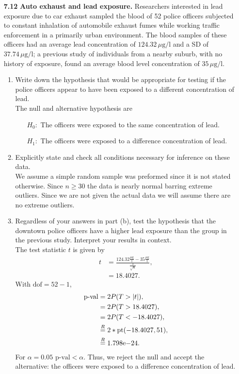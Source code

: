 \documentclass[a4paper, 12pt]{../../config/homework}
\begin{document}
\begin{enumerate}
\pagebreak
\item[\textbf{7.12}] \textbf{Auto exhaust and lead exposure.} Researchers interested in lead exposure due to car exhaust sampled the blood of 52 police officers subjected to constant inhalation of automobile exhaust fumes while working traffic enforcement in a primarily urban environment. The blood samples of these officers had an average lead concentration of \(124.32\,\mu\text{g}/\text{l}\) and a SD of \(37.74\,\mu\text{g}/\text{l}\); a previous study of individuals from a nearby suburb, with no history of exposure, found an average blood level concentration of \(35\,\mu\text{g}/\text{l}\).
\begin{enumerate}[label=(\alph*)]
\item Write down the hypothesis that would be appropriate for testing if the police officers appear to have been exposed to a different concentration of lead.
\\The null and alternative hypothesis are
\begin{enumerate}
\item[\(H_0 : \)] The officers were exposed to the same concentration of lead.
\item[\(H_1 : \)] The officers were exposed to a difference concentration of lead.
\end{enumerate}

\item Explicitly state and check all conditions necessary for inference on these data.
\\We assume a simple random sample was preformed since it is not stated otherwise. Since \(n \ge 30\) the data is nearly normal barring extreme outliers. Since we are not given the actual data we will assume there are no extreme outliers.

\item Regardless of your answers in part (b), test the hypothesis that the downtown police officers have a higher lead exposure than the group in the previous study. Interpret your results in context.
\\The test statistic \(t\) is given by
\begin{align*}
t &= \frac{124.32\frac{\mu\text{g}}{\text{l}} - 35\frac{\mu\text{g}}{\text{l}}}{\frac{s}{\sqrt{n}}},\\
&= 18.4027.
\end{align*}
With \(\text{dof}=52-1\),
\begin{align*}
\text{p-val} &= 2P(T > |t|),\\
&= 2P(T > 18.4027),\\
&= 2P(T < -18.4027),\\
&\overset{R}{=} 2*\text{pt}(-18.4027, 51),\\
&\overset{R}{=} {1.798}\mathrm{e}{-24}.
\end{align*}
For \(\alpha=0.05\) \(\text{p-val}<\alpha \). Thus, we reject the null and accept the alternative: the officers were exposed to a difference concentration of lead.
\end{enumerate}


\end{enumerate}
\end{document}
